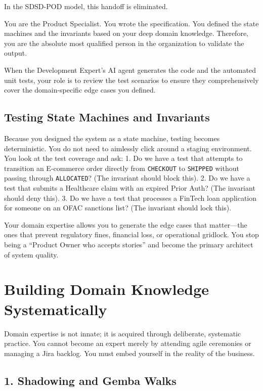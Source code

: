 \documentclass[
  11pt,
  openany,
  oneside]{book}
\begin{document}
In the SDSD-POD model, this handoff is eliminated.

You are the Product Specialist. You wrote the specification. You defined
the state machines and the invariants based on your deep domain
knowledge. Therefore, you are the absolute most qualified person in the
organization to validate the output.

When the Development Expert's AI agent generates the code and the
automated unit tests, your role is to review the test scenarios to
ensure they comprehensively cover the domain-specific edge cases you
defined.

\subsection{Testing State Machines and
Invariants}\label{testing-state-machines-and-invariants}

Because you designed the system as a state machine, testing becomes
deterministic. You do not need to aimlessly click around a staging
environment. You look at the test coverage and ask: 1. Do we have a test
that attempts to transition an E-commerce order directly from
\texttt{CHECKOUT} to \texttt{SHIPPED} without passing through
\texttt{ALLOCATED}? (The invariant should block this). 2. Do we have a
test that submits a Healthcare claim with an expired Prior Auth? (The
invariant should deny this). 3. Do we have a test that processes a
FinTech loan application for someone on an OFAC sanctions list? (The
invariant should lock this).

Your domain expertise allows you to generate the edge cases that
matter---the ones that prevent regulatory fines, financial loss, or
operational gridlock. You stop being a ``Product Owner who accepts
stories'' and become the primary architect of system quality.

\bigskip

\section{Building Domain Knowledge
Systematically}\label{building-domain-knowledge-systematically}

Domain expertise is not innate; it is acquired through deliberate,
systematic practice. You cannot become an expert merely by attending
agile ceremonies or managing a Jira backlog. You must embed yourself in
the reality of the business.

\subsection{1. Shadowing and Gemba
Walks}\label{shadowing-and-gemba-walks}
\end{document}
